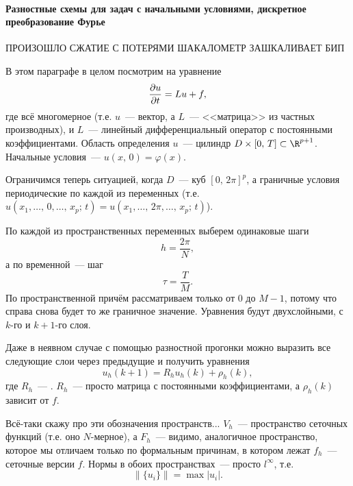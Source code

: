 \documentclass{trlnotes}
\begin{document}
    \paragraph{Разностные схемы для задач с начальными условиями, дискретное преобразование Фурье}

    \begin{rem}
        ПРОИЗОШЛО СЖАТИЕ С ПОТЕРЯМИ ШАКАЛОМЕТР ЗАШКАЛИВАЕТ БИП 
    \end{rem}

    В этом параграфе в целом посмотрим на уравнение 
    \[
        \dfrac{\partial u}{\partial t} = Lu + f,
    \]
    где всё многомерное (т.е. $u$~--- вектор, а $L$~--- <<матрица>> из частных производных), и $L$~--- линейный дифференциальный оператор с постоянными коэффициентами. Область определения $u$~--- цилиндр $D\times [0, \, T] \subset \R^{p + 1}$. Начальные условия~--- $u(x, \, 0) = \varphi(x)$.

    Ограничимся теперь ситуацией, когда $D$~--- куб $[0, \, 2\pi]^p$, а граничные условия периодические по каждой из переменных (т.е. $u(x_1, \ldots, \, 0, \ldots, \, x_p; \, t) = u(x_1, \ldots, \, 2\pi, \ldots, \, x_p; \, t)$). 

    По каждой из пространственных переменных выберем одинаковые шаги
    \[
        h = \dfrac{2\pi}{N},
    \] 
    а по временной~--- шаг
    \[
        \tau = \dfrac{T}{M}.
    \]
    По пространственной причём рассматриваем только от $0$ до $M-1$, потому что справа снова будет то же граничное значение. Уравнения будут двухслойными, с $k$-го и $k+1$-го слоя.

    Даже в неявном случае с помощью разностной прогонки можно выразить все следующие слои через предыдущие и получить уравнения
    \[
        u_h(k + 1) = R_h u_h(k) + \rho_h(k),
    \]
    где $R_h$~--- . $R_h$~--- просто матрица с постоянными коэффициентами, а $\rho_h(k)$ зависит от $f$.

    \begin{rem}
        Всё-таки скажу про эти обозначения пространств... $V_h$~--- пространство сеточных функций  (т.е. оно $N$-мерное), а $F_h$~--- видимо, аналогичное пространство, которое мы отличаем только по формальным причинам, в котором лежат $f_h$~--- сеточные версии $f$. Нормы в обоих пространствах~--- просто $l^{\infty}$, т.е.
        \[
            \big\|\{u_i\}\big\| = \max |u_i|.
        \]
    \end{rem}
\end{document}
